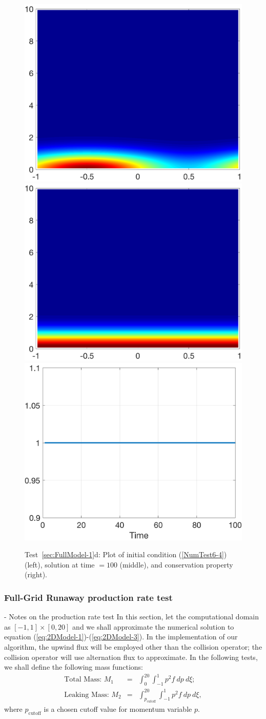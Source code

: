 \documentclass[preprint,11pt]{elsarticle}
\begin{document}
\begin{figure}[H]
\centering
\includegraphics[width=.32\textwidth]{./NumFig/FullModel2D-4-0}
\includegraphics[width=.32\textwidth]{./NumFig/FullModel2D-4-100}
\includegraphics[width=.32\textwidth]{./NumFig/FullModel2D-4-conv}
\caption{Test~\ref{sec:FullModel-1}d: Plot of initial condition (\ref{NumTest6-4}) (left), solution at time $= 100$ (middle), and conservation property (right).}
\end{figure}


\subsubsection{Full-Grid Runaway production rate test}
\label{sec:FullModel-2}
- Notes on the production rate test 
In this section, let the computational domain as $[-1,1]\times[0,20]$ and we shall approximate the numerical solution to equation (\ref{eq:2DModel-1})-(\ref{eq:2DModel-3}). In the implementation of our algorithm, the upwind flux will be employed other than the collision operator; the collision operator will use alternation flux to approximate. 
In the following tests, we shall define the following mass functions:
\begin{eqnarray}
    \text{Total Mass: }M_1&=&\int_{0}^{20} \int_{-1}^1 p^2 f \ dp \ d\xi;\label{eq:totalmass}\\
    \text{Leaking Mass: }M_2&=&\int_{p_\text{cutoff}}^{20} \int_{-1}^1 p^2 f \ dp \ d\xi,\label{eq:leakingmass}
\end{eqnarray}
where $p_\text{cutoff}$ is a chosen cutoff value for momentum variable $p.$
\end{document}
